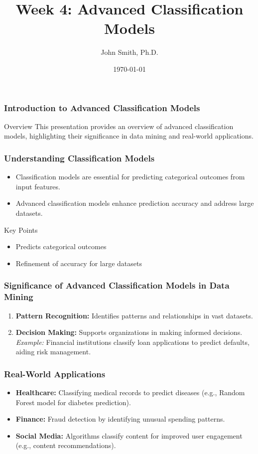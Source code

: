 \documentclass[aspectratio=169]{beamer}
\title[Week 4: Advanced Classification Models]{Week 4: Advanced Classification Models}
\author[J. Smith]{John Smith, Ph.D.}
\institute[University Name]{
  Department of Computer Science\\
  University Name\\
  \vspace{0.3cm}
  Email: email@university.edu\\
  Website: www.university.edu
}
\date{\today}
\begin{document}
\frame{\titlepage}

\begin{frame}[fragile]
    \frametitle{Introduction to Advanced Classification Models}
    \begin{block}{Overview}
        This presentation provides an overview of advanced classification models, highlighting their significance in data mining and real-world applications.
    \end{block}
\end{frame}

\begin{frame}[fragile]
    \frametitle{Understanding Classification Models}
    \begin{itemize}
        \item Classification models are essential for predicting categorical outcomes from input features.
        \item Advanced classification models enhance prediction accuracy and address large datasets.
    \end{itemize}
    \begin{block}{Key Points}
        \begin{itemize}
            \item Predicts categorical outcomes
            \item Refinement of accuracy for large datasets
        \end{itemize}
    \end{block}
\end{frame}

\begin{frame}[fragile]
    \frametitle{Significance of Advanced Classification Models in Data Mining}
    \begin{enumerate}
        \item \textbf{Pattern Recognition:} Identifies patterns and relationships in vast datasets.
        \item \textbf{Decision Making:} Supports organizations in making informed decisions.\\
        \textit{Example:} Financial institutions classify loan applications to predict defaults, aiding risk management.
    \end{enumerate}
\end{frame}

\begin{frame}[fragile]
    \frametitle{Real-World Applications}
    \begin{itemize}
        \item \textbf{Healthcare:} Classifying medical records to predict diseases (e.g., Random Forest model for diabetes prediction).
        \item \textbf{Finance:} Fraud detection by identifying unusual spending patterns.
        \item \textbf{Social Media:} Algorithms classify content for improved user engagement (e.g., content recommendations).
    \end{itemize}
\end{frame}
\end{document}
